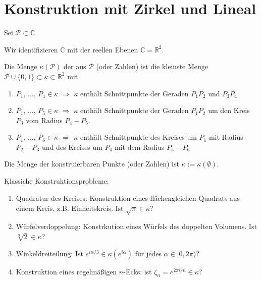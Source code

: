 \section{Konstruktion mit Zirkel und Lineal}

Sei $\mathscr P\subset \mathbb C$.

\begin{definition}
	Wir identifizieren $\mathbb C$ mit der reellen Ebenen $\mathbb C = \mathbb R^2$.
\end{definition}

\begin{definition}
	Die Menge $\kappa(\mathscr P)$ der aus $\mathscr P$  (oder Zahlen) ist die kleinste Menge $\mathscr P\cup \{0,1\} \subset \kappa\subset\mathbb R^2$ mit \begin{enumerate}[label={(\roman*)}]
		\item $P_1$, $\dots$, $P_4\in\kappa$ $\Rightarrow$ $\kappa$ enthält Schnittpunkte der Geraden $P_1P_2$ und $P_3 P_4$
		\item $P_1$, $\dots$, $P_5\in\kappa$ $\Rightarrow$ $\kappa$ enthält Schnittpunkte der Geraden $P_1P_2$ um den Kreis $P_3$ vom Radius $P_4 - P_5$.
		\item $P_1$, $\dots$, $P_6\in\kappa$ $\Rightarrow$ $\kappa$ enthält Schnittpunkte des Kreises um $P_1$ mit Radius $P_2 - P_3$ und des Kreises um $P_4$ mit dem Radius $P_5 - P_6$
	\end{enumerate}
	Die Menge der konstruierbaren Punkte (oder Zahlen) ist $\kappa := \kappa(\emptyset)$.
\end{definition}

\begin{example}
	Klassiche Konstruktionsprobleme:\begin{enumerate}[label={(\alph*)}]
		\item Quadratur des Kreises: Konstruktion eines flächengleichen Quadrats aus einem Kreis, z.B. Einheitskreis. Ist $\sqrt\pi\in\kappa$?
		\item Würfelverdoppelung: Konstrkution eines Würfels des doppelten Volumens. Ist $\sqrt[3]2\in\kappa$?
		\item Winkeldreiteilung: Ist $e^{i\alpha\slash3}\in\kappa(e^{i\alpha})$ für jedes $\alpha\in [0,2\pi)$?
		\item Konstruktion eines regelmäßigen $n$-Ecks: ist $\zeta_n = e^{2\pi i/n}\in \kappa$?
	\end{enumerate}
\end{example}

